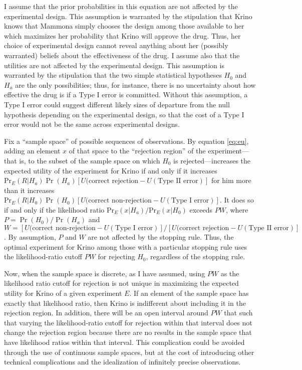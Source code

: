 \documentclass{article}
\theoremstyle{definition}
\begin{document}
I assume that the prior probabilities in this equation are not affected by the experimental design.
This assumption is warranted by the stipulation that Krino knows that Mammona simply chooses the design among those available to her which maximizes her probability that Krino will approve the drug.
Thus, her choice of experimental design cannot reveal anything about her (possibly warranted) beliefs about the effectiveness of the drug.
I assume also that the utilities are not affected by the experimental design.
This assumption is warranted by the stipulation that the two simple statistical hypotheses $H_0$ and $H_a$ are the only possibilities; thus, for instance, there is no uncertainty about how effective the drug is if a Type I error is committed.
Without this assumption, a Type I error could suggest different likely sizes of departure from the null hypothesis depending on the experimental design, so that the cost of a Type I error would not be the same across experimental designs.

Fix a ``sample space'' of possible sequences of observations.
By equation \ref{eq:eu}, adding an element $x$ of that space to the ``rejection region'' of the experiment---that is, to the subset of the sample space on which $H_0$ is rejected---increases the expected utility of the experiment for Krino if and only if it increases $\mbox{Pr}_E(R|H_a)\Pr(H_a)[U(\mbox{correct rejection}-U(\mbox{Type II error})]$ for him more than it increases $\mbox{Pr}_E(R|H_0)\Pr(H_0)[U(\mbox{correct non-rejection}-U(\mbox{Type I error})]$.
It does so if and only if the likelihood ratio $\mbox{Pr}_E(x|H_a)/\mbox{Pr}_E(x|H_0)$ exceeds $P W$, where $P=\Pr(H_0)/\Pr(H_a)$ and $W=[U(\mbox{correct non-rejection}-U(\mbox{Type I error})]/[U(\mbox{correct rejection}-U(\mbox{Type II error})]$.
By assumption, $P$ and $W$ are not affected by the stopping rule.
Thus, the optimal experiment for Krino among those with a particular stopping rule uses the likelihood-ratio cutoff $P W$ for rejecting $H_0$, regardless of the stopping rule.

Now, when the sample space is discrete, as I have assumed, using $P W$ as the likelihood ratio cutoff for rejection is not unique in maximizing the expected utility for Krino of a given experiment $E$.
If an element of the sample space has exactly that likelihood ratio, then Krino is indifferent about including it in the rejection region.
In addition, there will be an open interval around $P W$ that such that varying the likelihood-ratio cutoff for rejection within that interval does not change the rejection region because there are no results in the sample space that have likelihood ratios within that interval.
This complication could be avoided through the use of continuous sample spaces, but at the cost of introducing other technical complications and the idealization of infinitely precise observations.
\end{document}

